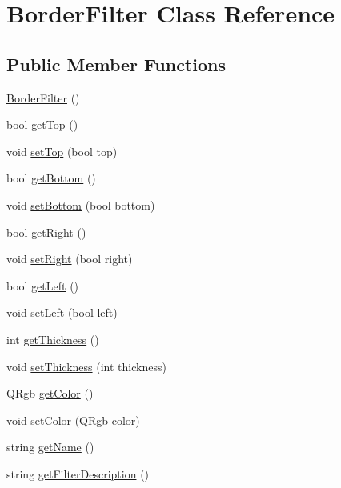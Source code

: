 \hypertarget{classModel_1_1Filter_1_1BorderFilter}{}\section{Border\+Filter Class Reference}
\label{classModel_1_1Filter_1_1BorderFilter}
\subsection*{Public Member Functions}
\begin{DoxyCompactItemize}
\item 
\hyperlink{classModel_1_1Filter_1_1BorderFilter_a293d30704fa72a0dad9ea5ef7e473c38}{Border\+Filter} ()
\item 
bool \hyperlink{classModel_1_1Filter_1_1BorderFilter_a7f662ce666098754b0916a828633f842}{get\+Top} ()
\item 
void \hyperlink{classModel_1_1Filter_1_1BorderFilter_a41a3d0253d877ec681fc30f85ae21aed}{set\+Top} (bool top)
\item 
bool \hyperlink{classModel_1_1Filter_1_1BorderFilter_ac96fcca335b0daaa5e216993666a7af2}{get\+Bottom} ()
\item 
void \hyperlink{classModel_1_1Filter_1_1BorderFilter_ae60a4cf24fcd4cc34ca831917a609e79}{set\+Bottom} (bool bottom)
\item 
bool \hyperlink{classModel_1_1Filter_1_1BorderFilter_a09836b29d544b94e145dd6a725887dd2}{get\+Right} ()
\item 
void \hyperlink{classModel_1_1Filter_1_1BorderFilter_a18165f5951ddba8f3b25b2a199f90bc1}{set\+Right} (bool right)
\item 
bool \hyperlink{classModel_1_1Filter_1_1BorderFilter_afb561071d09e3b031b1d951c51e94f24}{get\+Left} ()
\item 
void \hyperlink{classModel_1_1Filter_1_1BorderFilter_a07821fa96843dccb8ee4c9a711f1f43b}{set\+Left} (bool left)
\item 
int \hyperlink{classModel_1_1Filter_1_1BorderFilter_ab6b7bfb33162f992d1bb4e8d6699abef}{get\+Thickness} ()
\item 
void \hyperlink{classModel_1_1Filter_1_1BorderFilter_ae2faef96ee1277d229d6b6988c66e6d3}{set\+Thickness} (int thickness)
\item 
Q\+Rgb \hyperlink{classModel_1_1Filter_1_1BorderFilter_ae697defefbdf5f895406269b15758d91}{get\+Color} ()
\item 
void \hyperlink{classModel_1_1Filter_1_1BorderFilter_ad858846447f303e473dc8004ef607666}{set\+Color} (Q\+Rgb color)
\item 
string \hyperlink{classModel_1_1Filter_1_1BorderFilter_a11335e13e50af74108bf926dc1340b4b}{get\+Name} ()
\item 
string \hyperlink{classModel_1_1Filter_1_1BorderFilter_a62b7b60e24f92234393b840b35808e06}{get\+Filter\+Description} ()
\end{DoxyCompactItemize}
